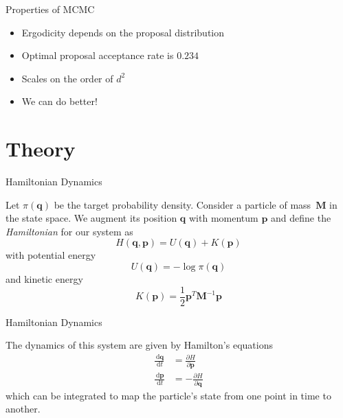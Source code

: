 \documentclass{beamer}
\newcommand{\dd}{\, \text{d}}
\renewcommand{\vec}[1]{\ensuremath{\mathbf{#1}}}
\newcommand{\mat}[1]{\ensuremath{\mathbf{#1}}}
\begin{document}
    \begin{frame}{Properties of MCMC}

        \begin{itemize}
            \item Ergodicity depends on the proposal distribution
            \item Optimal proposal acceptance rate is $0.234$
            \item Scales on the order of $d^2$
            \item We can do better!
        \end{itemize}

    \end{frame}

    \section{Theory}

    \begin{frame}{Hamiltonian Dynamics}
        \begin{definition}
            Let $\pi\left(\vec{q}\right)$ be the target probability density.
            Consider a particle of mass~$\mat{M}$ in the state space.
            We augment its position $\vec{q}$ with momentum $\vec{p}$ and define
            the \emph{Hamiltonian} for our system as
            \begin{equation*}
                H\left(\vec{q},\vec{p}\right) = U\left(\vec{q}\right) + K\left(\vec{p}\right)
            \end{equation*}
            with potential energy
            \begin{equation*}
                U\left(\vec{q}\right) = - \log{\pi\left(\vec{q}\right)}
            \end{equation*}
            and kinetic energy
            \begin{equation*}
                K\left(\vec{p}\right) = \frac{1}{2} \vec{p}^T \mat{M}^{-1} \vec{p}
            \end{equation*}
        \end{definition}
        
    \end{frame}

    \begin{frame}{Hamiltonian Dynamics}

        The dynamics of this system are given by Hamilton's equations
            \begin{align*}
                \frac{\dd \vec{q}}{\dd t} &= \frac{\partial H}{\partial \vec{p}} \\
                \frac{\dd \vec{p}}{\dd t} &= -\frac{\partial H}{\partial \vec{q}}
            \end{align*}
        which can be integrated to map the particle's state from one point in time to another.

    \end{frame}
\end{document}
